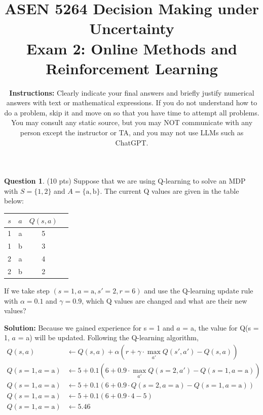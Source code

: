 \documentclass{article}
\title{ASEN 5264 Decision Making under Uncertainty\\
       Exam 2: Online Methods and Reinforcement Learning}
\date{\small 
    \textbf{Instructions:} Clearly indicate your final answers and briefly justify numerical answers with text or mathematical expressions. If you do not understand how to do a problem, skip it and move on so that you have time to attempt all problems. You may consult any static source, but you may NOT communicate with any person except the instructor or TA, and you may not use LLMs such as ChatGPT.
}
\theoremstyle{definition}
\newtheorem{question}[thm]{Question}
\begin{document}
\maketitle


\begin{question} (10 pts)
    Suppose that we are using Q-learning to solve an MDP with $S = \{1, 2\}$ and $A = \{\text{a}, \text{b}\}$. The current Q values are given in the table below:
    \begin{center}
        \begin{tabular}{cc|cc}
            \toprule
            $s$ & $a$ & $Q(s, a)$ \\
            \midrule
            1 & a & 5 \\
            1 & b & 3 \\
            2 & a & 4 \\
            2 & b & 2 \\
            \bottomrule
        \end{tabular}
    \end{center}
    If we take step $(s=1, a=\text{a}, s'=2, r=6)$ and use the Q-learning update rule with $\alpha = 0.1$ and $\gamma = 0.9$, which Q values are changed and what are their new values?
\end{question}
\noindent \textbf{Solution: }
Because we gained experience for s = 1 and $a$ = a, the value for Q(s = 1, $a$ = a) will be updated. Following the Q-learning algorithm,
\begin{align*}
    Q(s,a) &\leftarrow Q(s,a) + \alpha\left(r + \gamma \cdot\max_{a'}Q(s',a') - Q(s,a)\right)\\
    Q(s=1,a=\text{a}) &\leftarrow 5 + 0.1\left(6 + 0.9\cdot \max_{a'}Q(s=2,a') - Q(s=1,a=\text{a})\right)\\
    Q(s=1,a=\text{a}) &\leftarrow 5 + 0.1\left(6 + 0.9\cdot Q(s=2,a = \text{a}) - Q(s=1,a=\text{a})\right)\\
    Q(s=1,a=\text{a}) &\leftarrow 5 + 0.1\left(6 + 0.9\cdot4 - 5\right)\\
    Q(s=1,a=\text{a}) &\leftarrow \boxed{5.46}\\
\end{align*}
\end{document}

